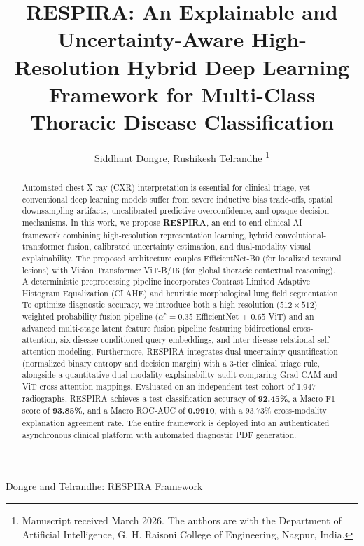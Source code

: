 \documentclass[journal]{IEEEtran}
\begin{document}
\title{RESPIRA: An Explainable and Uncertainty-Aware High-Resolution Hybrid Deep Learning Framework for Multi-Class Thoracic Disease Classification}

\author{Siddhant Dongre, Rushikesh Telrandhe
\thanks{Manuscript received March 2026. The authors are with the Department of Artificial Intelligence, G. H. Raisoni College of Engineering, Nagpur, India.}
}

%
{Dongre and Telrandhe: RESPIRA Framework}

\maketitle

\begin{abstract}
Automated chest X-ray (CXR) interpretation is essential for clinical triage, yet conventional deep learning models suffer from severe inductive bias trade-offs, spatial downsampling artifacts, uncalibrated predictive overconfidence, and opaque decision mechanisms. In this work, we propose \textbf{RESPIRA}, an end-to-end clinical AI framework combining high-resolution representation learning, hybrid convolutional-transformer fusion, calibrated uncertainty estimation, and dual-modality visual explainability. The proposed architecture couples EfficientNet-B0 (for localized textural lesions) with Vision Transformer ViT-B/16 (for global thoracic contextual reasoning). A deterministic preprocessing pipeline incorporates Contrast Limited Adaptive Histogram Equalization (CLAHE) and heuristic morphological lung field segmentation. To optimize diagnostic accuracy, we introduce both a high-resolution ($512 \times 512$) weighted probability fusion pipeline ($\alpha^* = 0.35$ EfficientNet + $0.65$ ViT) and an advanced multi-stage latent feature fusion pipeline featuring bidirectional cross-attention, six disease-conditioned query embeddings, and inter-disease relational self-attention modeling. Furthermore, RESPIRA integrates dual uncertainty quantification (normalized binary entropy and decision margin) with a 3-tier clinical triage rule, alongside a quantitative dual-modality explainability audit comparing Grad-CAM and ViT cross-attention mappings. Evaluated on an independent test cohort of 1,947 radiographs, RESPIRA achieves a test classification accuracy of \textbf{92.45\%}, a Macro F1-score of \textbf{93.85\%}, and a Macro ROC-AUC of \textbf{0.9910}, with a 93.73\% cross-modality explanation agreement rate. The entire framework is deployed into an authenticated asynchronous clinical platform with automated diagnostic PDF generation.
\end{abstract}
\end{document}
